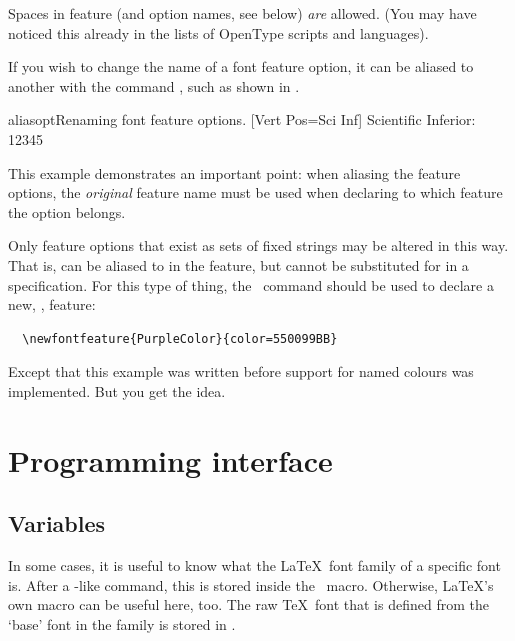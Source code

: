 \documentclass[a4paper]{l3doc}
\begin{document}
Spaces in feature (and option names, see below) \emph{are} allowed. (You may have
noticed this already in the lists of OpenType scripts and languages).

\DescribeMacro{\aliasfontfeatureoption}
If you wish to change the name of a font feature option,
it can be aliased to another with the command
, such as shown in .

\begin{Lexample}{aliasopt}{Renaming font feature options.}
  [Vert Pos=Sci Inf]
   Scientific Inferior: 12345
\end{Lexample}

This example demonstrates an important point: when aliasing the feature
options, the \emph{original} feature name must be used when declaring
to which feature the option belongs.

Only feature options that exist as sets of fixed strings may be altered in
this way. That is,  can be aliased to  in the
 feature, but  cannot be substituted for 
in a  specification. For this type of thing, the \cmd\newfontfeature\
command should be used to declare a new, \eg,  feature:
\begin{Verbatim}
  \newfontfeature{PurpleColor}{color=550099BB}
\end{Verbatim}
Except that this example was written before support for named colours was
implemented. But you get the idea.




\section{Programming interface}
\label{sec:api}


\subsection{Variables}

In some cases, it is useful to know what the \LaTeX\ font family
of a specific \pkg{fontspec} font is. After a \cmd\fontspec-like
command, this is stored inside the \cmd{\l_fontspec_family_tl}\ macro.
Otherwise, \LaTeX's own \cmd{\f@family} macro can be useful here,
too.
The raw \TeX\ font that is defined from the `base' font in the family is stored in .
\end{document}
